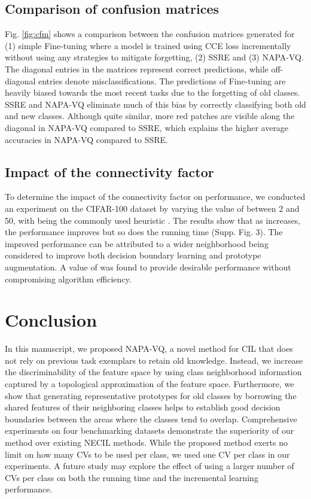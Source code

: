\documentclass[10pt,twocolumn,letterpaper]{article}
\begin{document}
\subsection{Comparison of confusion matrices}

Fig. \ref{fig:cfm} shows a comparison between the confusion matrices generated for (1) simple Fine-tuning where a model is trained using CCE loss incrementally without using any strategies to mitigate forgetting, (2) SSRE and (3) NAPA-VQ. The diagonal entries in the matrices represent correct predictions, while off-diagonal entries denote misclassifications. The predictions of Fine-tuning are heavily biased towards the most recent tasks due to the forgetting of old classes. SSRE and NAPA-VQ eliminate much of this bias by correctly classifying both old and new classes. Although quite similar, more red patches are visible along the diagonal in NAPA-VQ compared to SSRE, which explains the higher average accuracies in NAPA-VQ compared to SSRE.


\subsection{Impact of the connectivity factor }

 To determine the impact of the connectivity factor  on performance, we conducted an experiment on the CIFAR-100 dataset by varying the value of  between 2 and 50, with  being the commonly used heuristic \cite{ThomasMartinetzandKlausSchulten1991ATopologies, Fritzke1994ATopologies}. The results show that as  increases, the performance improves but so does the running time (Supp. Fig. 3). The improved performance 
 can be attributed to a wider neighborhood being considered to
improve both decision boundary learning and prototype augmentation. A value of  was found to provide desirable performance without compromising algorithm efficiency.

\section{Conclusion}
In this manuscript, we proposed NAPA-VQ, a novel method for CIL that does not rely on previous task exemplars to retain old knowledge. Instead, we increase the discriminability of the feature space by using class neighborhood information captured by a topological approximation of the feature space. Furthermore, we show that generating representative prototypes for old classes by borrowing the shared features of their neighboring classes helps to establish good decision boundaries between the areas where the classes tend to overlap. Comprehensive experiments on four benchmarking datasets demonstrate the superiority of our method over existing NECIL methods. While the proposed method exerts no limit on how many CVs to be used per class, we used one CV per class in our experiments. A future study may explore the effect of using a larger number of CVs per class on both the running time and the incremental learning performance. 
\end{document}
